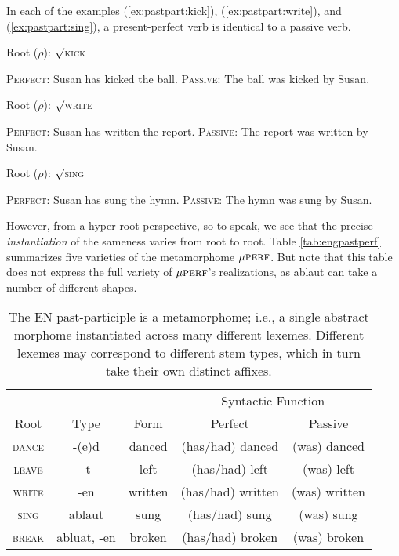 In each of the examples (\ref{ex:pastpart:kick}), (\ref{ex:pastpart:write}), and (\ref{ex:pastpart:sing}), a present-perfect verb is identical to 
a passive verb.
\begin{exe}
\label{ex:pastpart}
	\ex Root ($\rho$): $\surd$\textsc{kick}
		\begin{xlist} \label{ex:pastpart:kick}
		\ex \textsc{Perfect:} Susan has kicked the ball. \label{ex:pastpart:kick:perf}
		\ex \textsc{Passive:} The ball was kicked by Susan.\label{ex:pastpart:kick:pass}
		\end{xlist}
	\ex Root ($\rho$): $\surd$\textsc{write}
		\begin{xlist} \label{ex:pastpart:write}
		\ex \textsc{Perfect:} Susan has written the report. \label{ex:pastpart:write:perf}
		\ex \textsc{Passive:} The report was written by Susan. \label{ex:pastpart:write:pass}
		\end{xlist}
	\ex Root ($\rho$): $\surd$\textsc{sing}
		\begin{xlist} \label{ex:pastpart:sing}
		\ex \textsc{Perfect:} Susan has sung the hymn. \label{ex:pastpart:sing:perf}
		\ex \textsc{Passive:} The hymn was sung by Susan. \label{ex:pastpart:sing:pass}
		\end{xlist}
\end{exe}
However,
from a hyper-root perspective, so to speak, we see that the precise \emph{instantiation} of the sameness varies from root to root.  
Table \ref{tab:engpastperf} summarizes five varieties of the metamorphome $\mu{\textsc{perf}}$. But note that this table
does not express the full variety of $\mu{\textsc{perf}}$'s realizations, as ablaut can take a number of different shapes.
\begin{table}[ht]
\centering %
\begin{tabular}{c c c c c} %
\hline
& & & \multicolumn{2}{c}{Syntactic Function} \\[-1ex] 
Root & Type & Form & Perfect & Passive  \\ [0.5ex] %
\hline
\textsc{dance} & -(e)d & danced & (has/had) danced & (was) danced \\
\textsc{leave} & -t & left & (has/had) left & (was) left \\ 
\textsc{write} & -en & written & (has/had) written & (was) written \\
\textsc{sing} & ablaut & sung & (has/had) sung & (was) sung \\
\textsc{break} & abluat, -en & broken & (has/had) broken & (was) broken \\
\hline 
\end{tabular}
\label{tab:engpastpart}
\caption{The \ac{EN} past-participle is a metamorphome; i.e., a single abstract morphome instantiated across many different lexemes. Different lexemes may correspond to different stem types, which in turn take their own distinct affixes.}
\end{table}

